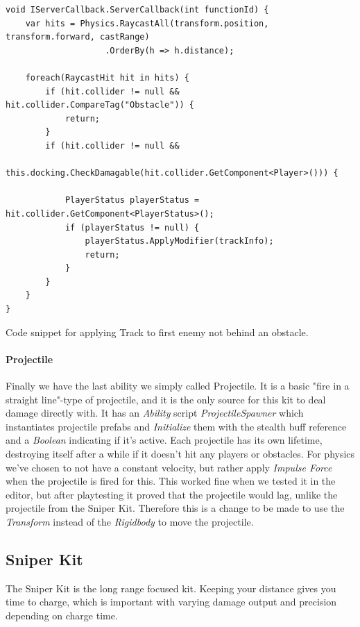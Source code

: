 \begin{listing}[htb]
\begin{verbatim}
void IServerCallback.ServerCallback(int functionId) {
    var hits = Physics.RaycastAll(transform.position, transform.forward, castRange)
                    .OrderBy(h => h.distance);
    
    foreach(RaycastHit hit in hits) {
        if (hit.collider != null && hit.collider.CompareTag("Obstacle")) {
            return;
        }
        if (hit.collider != null && 
            this.docking.CheckDamagable(hit.collider.GetComponent<Player>())) {
            
            PlayerStatus playerStatus = hit.collider.GetComponent<PlayerStatus>();
            if (playerStatus != null) {
                playerStatus.ApplyModifier(trackInfo);
                return;
            }
        }
    } 
}
\end{verbatim}
\caption[Applying the tracking debuff]{Code snippet for applying Track to first enemy not behind an obstacle.}
\label{listing:applyingTrack}
\end{listing}

\paragraph{Projectile}
Finally we have the last ability we simply called Projectile. It is a basic "fire in a straight line"-type of projectile, and it is the only source for this kit to deal damage directly with. It has an \emph{Ability} script \emph{ProjectileSpawner} which instantiates projectile prefabs and \emph{Initialize} them with the stealth buff reference and a \emph{Boolean} indicating if it's active. Each projectile has its own lifetime, destroying itself after a while if it doesn't hit any players or obstacles. For physics we've chosen to not have a constant velocity, but rather apply \emph{Impulse Force} when the projectile is fired for this. This worked fine when we tested it in the editor, but after playtesting it proved that the projectile would lag, unlike the projectile from the Sniper Kit. Therefore this is a change to be made to use the \emph{Transform} instead of the \emph{Rigidbody} to move the projectile.

\subsection{Sniper Kit}
The Sniper Kit is the long range focused kit. Keeping your distance gives you time to charge, which is important with varying damage output and precision depending on charge time.

